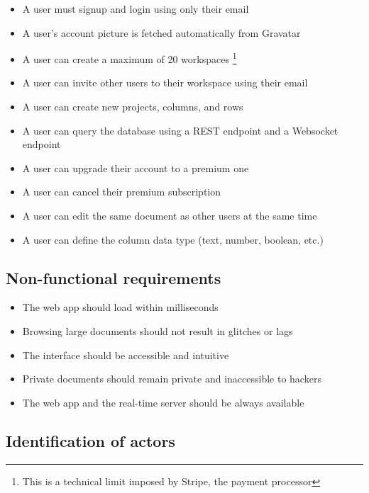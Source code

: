\documentclass[
  12pt,
  a4paper,
]{article}
\providecommand{\tightlist}{%
  \setlength{\itemsep}{0pt}\setlength{\parskip}{0pt}}
\begin{document}
\begin{itemize}
\tightlist
\item
  A user must signup and login using only their email
\item
  A user's account picture is fetched automatically from Gravatar
\item
  A user can create a maximum of 20 workspaces \footnote{This is a
    technical limit imposed by Stripe, the payment processor}
\item
  A user can invite other users to their workspace using their email
\item
  A user can create new projects, columns, and rows
\item
  A user can query the database using a REST endpoint and a Websocket
  endpoint
\item
  A user can upgrade their account to a premium one
\item
  A user can cancel their premium subscription
\item
  A user can edit the same document as other users at the same time
\item
  A user can define the column data type (text, number, boolean, etc.)
\end{itemize}

\hypertarget{non-functional-requirements}{%
\subsection{Non-functional
requirements}\label{non-functional-requirements}}

\begin{itemize}
\tightlist
\item
  The web app should load within milliseconds
\item
  Browsing large documents should not result in glitches or lags
\item
  The interface should be accessible and intuitive
\item
  Private documents should remain private and inaccessible to hackers
\item
  The web app and the real-time server should be always available
\end{itemize}

\hypertarget{identification-of-actors}{%
\subsection{Identification of actors}\label{identification-of-actors}}
\end{document}
